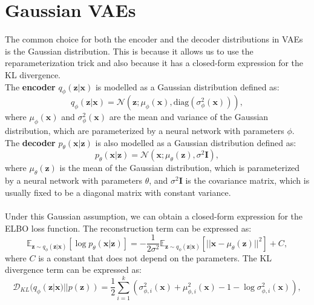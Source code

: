 \section{Gaussian VAEs}
The common choice for both the encoder and the decoder distributions in VAEs is the Gaussian distribution. This is because it allows us to use the reparameterization trick and 
also because it has a closed-form expression for the KL divergence. \\
The \textbf{encoder} $q_{\phi}(\mathbf{z}|\mathbf{x})$ is modelled as a Gaussian distribution defined as:
\begin{equation}
    q_{\phi}(\mathbf{z}|\mathbf{x}) = \mathcal{N} \left(\mathbf{z}; \mu_{\phi}(\mathbf{x}), \text{diag}(\sigma^2_{\phi}(\mathbf{x})) \right),
\end{equation}
where $\mu_{\phi}(\mathbf{x})$ and $\sigma^2_{\phi}(\mathbf{x})$ are the mean and variance of the Gaussian distribution, which are parameterized by a neural network with parameters $\phi$. \\
The \textbf{decoder} $p_{\theta}(\mathbf{x}|\mathbf{z})$ is also modelled as a Gaussian distribution defined as:
\begin{equation}
    p_{\theta}(\mathbf{x}|\mathbf{z}) = \mathcal{N} \left(\mathbf{x}; \mu_{\theta}(\mathbf{z}), \sigma^2\mathbf{I} \right),
\end{equation}
where $\mu_{\theta}(\mathbf{z})$ is the mean of the Gaussian distribution, which is parameterized by a neural network with parameters $\theta$, and $\sigma^2\mathbf{I}$ is the covariance matrix, 
which is usually fixed to be a diagonal matrix with constant variance. \\ 
\\
Under this Gaussian assumption, we can obtain a closed-form expression for the ELBO loss function. The reconstruction term can be expressed as:
\begin{equation}
    \mathbb{E}_{\mathbf{z}\sim q_{\phi}(\mathbf{z}|\mathbf{x})} \left[\log p_{\theta}(\mathbf{x}|\mathbf{z})\right] = -\frac{1}{2\sigma^2} \mathbb{E}_{\mathbf{z}\sim q_{\phi}(\mathbf{z}|\mathbf{x})} \left[||\mathbf{x} - \mu_{\theta}(\mathbf{z})||^2\right] + C,
\end{equation}
where $C$ is a constant that does not depend on the parameters. The KL divergence term can be expressed as:
\begin{equation}
    \mathcal{D}_{KL}(q_{\phi}(\mathbf{z}|\mathbf{x}) || p(\mathbf{z})) = \frac{1}{2} \sum_{i=1}^k \left( \sigma^2_{\phi,i}(\mathbf{x}) + \mu^2_{\phi,i}(\mathbf{x}) - 1 - \log \sigma^2_{\phi,i}(\mathbf{x}) \right),
\end{equation}

